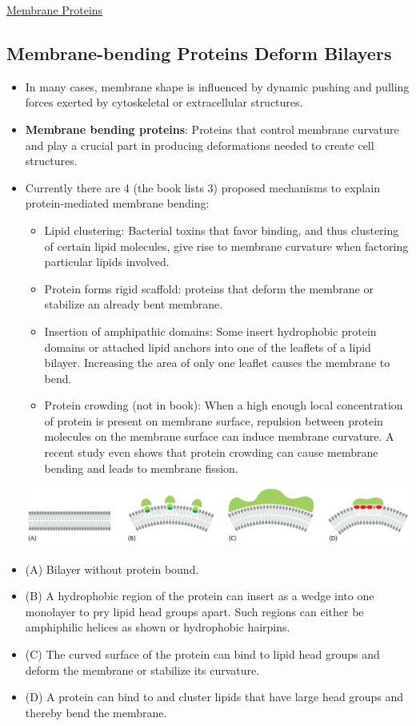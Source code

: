 \documentclass[12pt,letterpaper]{article}
\begin{document}
\begin{secbox}{\hyperlink{10}{Membrane Proteins}}
{    \hypertarget{10.15}{\subsection*{Membrane-bending Proteins Deform Bilayers}}
    \begin{itemize}
        \item In many cases, membrane shape is influenced by dynamic pushing and pulling forces exerted by cytoskeletal or extracellular structures.
        \item \textbf{Membrane bending proteins}: Proteins that control membrane curvature and play a crucial part in producing deformations needed to create cell structures.
        \item Currently there are 4 (the book lists 3) proposed mechanisms to explain protein-mediated membrane bending:
            \begin{itemize}[label=$\circ$]
                \item Lipid clustering: Bacterial toxins that favor binding, and thus clustering of certain lipid molecules, give rise to membrane curvature when factoring particular lipids involved.
                \item Protein forms rigid scaffold: proteins that deform the membrane or stabilize an already bent membrane.
                \item Insertion of amphipathic domains: Some insert hydrophobic protein domains or attached lipid anchors into one of the leaflets of a lipid bilayer. Increasing the area of only one leaflet causes the membrane to bend.
                \item Protein crowding (not in book): When a high enough local concentration of protein is present on membrane surface, repulsion between protein molecules on the membrane surface can induce membrane curvature. A recent study even shows that protein crowding can cause membrane bending and leads to membrane fission.
            \end{itemize}
        \includegraphics[width=\linewidth]{images/figure_10_40.png}
        \item (A) Bilayer without protein bound. 
        \item (B) A hydrophobic region of the protein can insert as a wedge into one monolayer to pry lipid head groups apart. Such regions can either be amphiphilic helices as shown or hydrophobic hairpins. 
        \item (C) The curved surface of the protein can bind to lipid head groups and deform the membrane or stabilize its curvature. 
        \item (D) A protein can bind to and cluster lipids that have large head groups and thereby bend the membrane. 
    \end{itemize}

}
\end{secbox}
\end{document}
